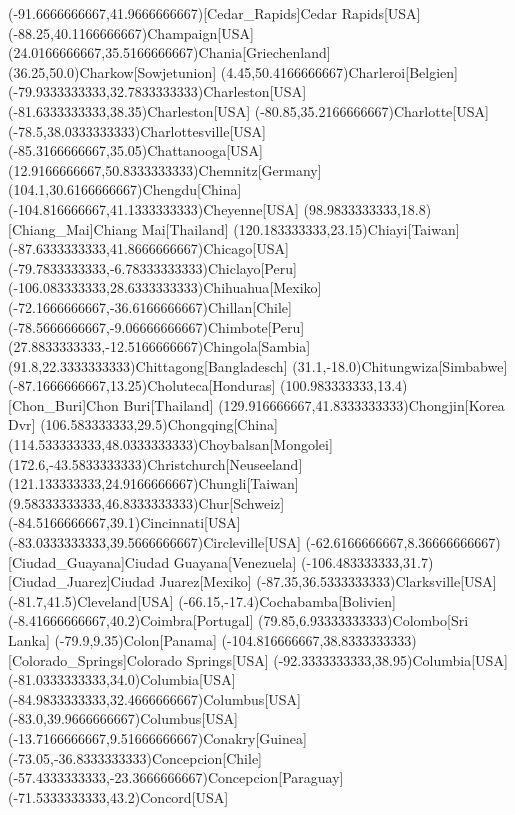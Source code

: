 \mapput(-91.6666666667,41.9666666667)[Cedar_Rapids]{Cedar Rapids}[USA]
\mapput(-88.25,40.1166666667){Champaign}[USA]
\mapput(24.0166666667,35.5166666667){Chania}[Griechenland]
\mapput(36.25,50.0){Charkow}[Sowjetunion]
\mapput(4.45,50.4166666667){Charleroi}[Belgien]
\mapput(-79.9333333333,32.7833333333){Charleston}[USA]
\mapput(-81.6333333333,38.35){Charleston}[USA]
\mapput(-80.85,35.2166666667){Charlotte}[USA]
\mapput(-78.5,38.0333333333){Charlottesville}[USA]
\mapput(-85.3166666667,35.05){Chattanooga}[USA]
\mapput(12.9166666667,50.8333333333){Chemnitz}[Germany]
\mapput(104.1,30.6166666667){Chengdu}[China]
\mapput(-104.816666667,41.1333333333){Cheyenne}[USA]
\mapput(98.9833333333,18.8)[Chiang_Mai]{Chiang Mai}[Thailand]
\mapput(120.183333333,23.15){Chiayi}[Taiwan]
\mapput(-87.6333333333,41.8666666667){Chicago}[USA]
\mapput(-79.7833333333,-6.78333333333){Chiclayo}[Peru]
\mapput(-106.083333333,28.6333333333){Chihuahua}[Mexiko]
\mapput(-72.1666666667,-36.6166666667){Chillan}[Chile]
\mapput(-78.5666666667,-9.06666666667){Chimbote}[Peru]
\mapput(27.8833333333,-12.5166666667){Chingola}[Sambia]
\mapput(91.8,22.3333333333){Chittagong}[Bangladesch]
\mapput(31.1,-18.0){Chitungwiza}[Simbabwe]
\mapput(-87.1666666667,13.25){Choluteca}[Honduras]
\mapput(100.983333333,13.4)[Chon_Buri]{Chon Buri}[Thailand]
\mapput(129.916666667,41.8333333333){Chongjin}[Korea Dvr]
\mapput(106.583333333,29.5){Chongqing}[China]
\mapput(114.533333333,48.0333333333){Choybalsan}[Mongolei]
\mapput(172.6,-43.5833333333){Christchurch}[Neuseeland]
\mapput(121.133333333,24.9166666667){Chungli}[Taiwan]
\mapput(9.58333333333,46.8333333333){Chur}[Schweiz]
\mapput(-84.5166666667,39.1){Cincinnati}[USA]
\mapput(-83.0333333333,39.5666666667){Circleville}[USA]
\mapput(-62.6166666667,8.36666666667)[Ciudad_Guayana]{Ciudad Guayana}[Venezuela]
\mapput(-106.483333333,31.7)[Ciudad_Juarez]{Ciudad Juarez}[Mexiko]
\mapput(-87.35,36.5333333333){Clarksville}[USA]
\mapput(-81.7,41.5){Cleveland}[USA]
\mapput(-66.15,-17.4){Cochabamba}[Bolivien]
\mapput(-8.41666666667,40.2){Coimbra}[Portugal]
\mapput(79.85,6.93333333333){Colombo}[Sri Lanka]
\mapput(-79.9,9.35){Colon}[Panama]
\mapput(-104.816666667,38.8333333333)[Colorado_Springs]{Colorado Springs}[USA]
\mapput(-92.3333333333,38.95){Columbia}[USA]
\mapput(-81.0333333333,34.0){Columbia}[USA]
\mapput(-84.9833333333,32.4666666667){Columbus}[USA]
\mapput(-83.0,39.9666666667){Columbus}[USA]
\mapput(-13.7166666667,9.51666666667){Conakry}[Guinea]
\mapput(-73.05,-36.8333333333){Concepcion}[Chile]
\mapput(-57.4333333333,-23.3666666667){Concepcion}[Paraguay]
\mapput(-71.5333333333,43.2){Concord}[USA]
